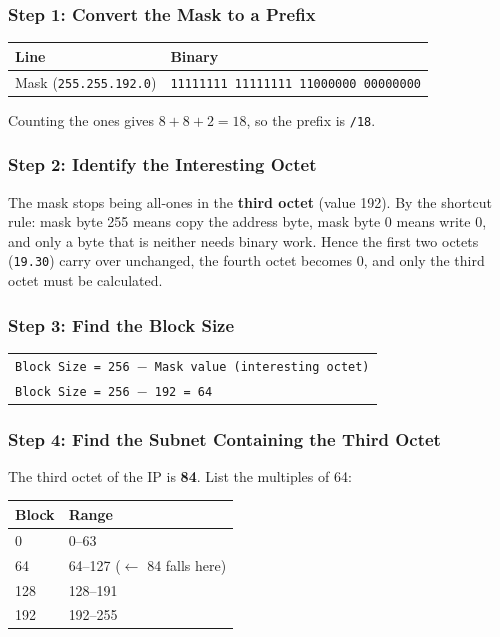 \documentclass[11pt,a4paper]{article}
\begin{document}
\subsubsection*{Step 1: Convert the Mask to a Prefix}

\begin{tabularx}{\textwidth}{@{}lX@{}}
\toprule
\rowcolor{tablehead}\textbf{Line} & \textbf{Binary} \\
\midrule
Mask (\texttt{255.255.192.0}) & \texttt{11111111 11111111 11000000 00000000} \\
\bottomrule
\end{tabularx}

Counting the ones gives $8 + 8 + 2 = 18$, so the prefix is \texttt{/18}.

\subsubsection*{Step 2: Identify the Interesting Octet}

The mask stops being all-ones in the \textbf{third octet} (value 192). By the
shortcut rule: mask byte 255 means copy the address byte, mask byte 0 means write
0, and only a byte that is neither needs binary work. Hence the first two octets
(\texttt{19.30}) carry over unchanged, the fourth octet becomes 0, and only the
third octet must be calculated.

\subsubsection*{Step 3: Find the Block Size}

\begin{tabularx}{\textwidth}{@{}X@{}}
\texttt{Block Size = 256 $-$ Mask value (interesting octet)} \\
\texttt{Block Size = 256 $-$ 192 = 64} \\
\end{tabularx}

\subsubsection*{Step 4: Find the Subnet Containing the Third Octet}

The third octet of the IP is \textbf{84}. List the multiples of 64:

\begin{tabularx}{\textwidth}{@{}lX@{}}
\toprule
\rowcolor{tablehead}\textbf{Block} & \textbf{Range} \\
\midrule
0 & 0--63 \\
64 & 64--127 ($\leftarrow$ 84 falls here) \\
128 & 128--191 \\
192 & 192--255 \\
\bottomrule
\end{tabularx}
\end{document}
